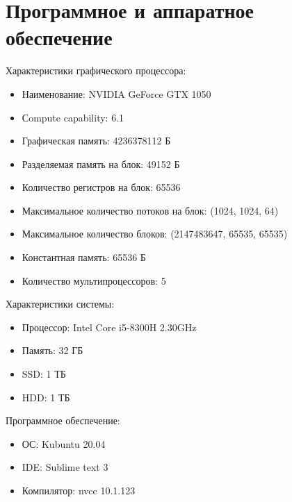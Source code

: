 \section{Программное и аппаратное обеспечение}
Характеристики графического процессора:
\begin{itemize}[noitemsep, topsep=0pt]
	\item Наименование: NVIDIA GeForce GTX 1050
	\item Сompute capability: 6.1
	\item Графическая память: 4236378112 Б
	\item Разделяемая память на блок: 49152 Б
	\item Количество регистров на блок: 65536
	\item Максимальное количество потоков на блок: (1024, 1024, 64)
	\item Максимальное количество блоков: (2147483647, 65535, 65535)
	\item Константная память: 65536 Б
	\item Количество мультипроцессоров: 5
\end{itemize}

Характеристики системы:
\begin{itemize}[noitemsep, topsep=0pt]
	\item Процессор: Intel Core i5-8300H 2.30GHz
	\item Память: 32 ГБ
	\item SSD: 1 ТБ
	\item HDD: 1 ТБ
\end{itemize}

Программное обеспечение:
\begin{itemize}[noitemsep, topsep=0pt]
	\item ОС: Kubuntu 20.04
	\item IDE: Sublime text 3
	\item Компилятор: nvcc 10.1.123
\end{itemize}
